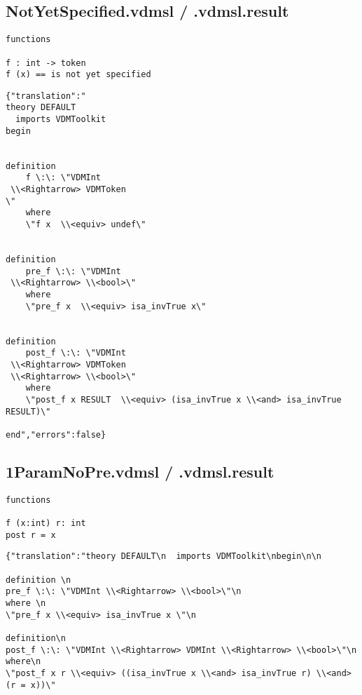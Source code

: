 \begin{appendices}
\subsection{NotYetSpecified.vdmsl / .vdmsl.result}
\begin{lstlisting}
functions

f : int -> token
f (x) == is not yet specified
\end{lstlisting}

\begin{lstlisting}
{"translation":"
theory DEFAULT
  imports VDMToolkit
begin


definition
    f \:\: \"VDMInt
 \\<Rightarrow> VDMToken
\"
    where
    \"f x  \\<equiv> undef\"


definition
    pre_f \:\: \"VDMInt
 \\<Rightarrow> \\<bool>\"
    where
    \"pre_f x  \\<equiv> isa_invTrue x\"


definition
    post_f \:\: \"VDMInt
 \\<Rightarrow> VDMToken
 \\<Rightarrow> \\<bool>\"
    where
    \"post_f x RESULT  \\<equiv> (isa_invTrue x \\<and> isa_invTrue RESULT)\"

end","errors":false}
\end{lstlisting}

\subsection{1ParamNoPre.vdmsl / .vdmsl.result}
\begin{lstlisting}
functions

f (x:int) r: int
post r = x
\end{lstlisting}

\begin{lstlisting}
{"translation":"theory DEFAULT\n  imports VDMToolkit\nbegin\n\n

definition \n
pre_f \:\: \"VDMInt \\<Rightarrow> \\<bool>\"\n
where \n
\"pre_f x \\<equiv> isa_invTrue x \"\n

definition\n
post_f \:\: \"VDMInt \\<Rightarrow> VDMInt \\<Rightarrow> \\<bool>\"\n
where\n
\"post_f x r \\<equiv> ((isa_invTrue x \\<and> isa_invTrue r) \\<and> (r = x))\"




\end{lstlisting}
\end{appendices}
